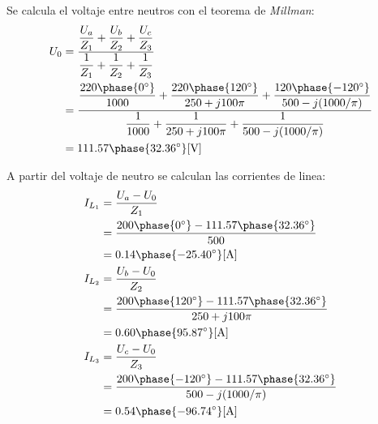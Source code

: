 \documentclass[letter,11pt]{article}
\begin{document}
\begin{enumerate}
Se calcula el voltaje entre neutros con el teorema de \emph{Millman}:
\begin{equation*}
    \begin{split}
        U_0 &= \dfrac{
                   \dfrac{U_a}{Z_1}+\dfrac{U_b}{Z_2}+\dfrac{U_c}{Z_3}
               }{
                   \dfrac{1}{Z_1}+\dfrac{1}{Z_2}+\dfrac{1}{Z_3}
               }\\
            &= \dfrac{
                   \dfrac{220\phase{0^{\circ}}}{1000}+
                   \dfrac{220\phase{120^{\circ}}}{250+j100\pi}+
                   \dfrac{120\phase{-120^{\circ}}}{500-j(1000/\pi)}
               }{
                   \dfrac{1}{1000}+
                   \dfrac{1}{250+j100\pi}+
                   \dfrac{1}{500-j(1000/\pi)}
               }\\
            &= 111.57\phase{32.36^{\circ}}[\text{V}]\\
    \end{split}
\end{equation*}

A partir del voltaje de neutro se calculan las corrientes de linea:
\begin{equation*}
    \begin{split}
        I_{L_1} &= \frac{U_a - U_0}{Z_1}\\
                &= \frac{200\phase{0^{\circ}}
                   -111.57\phase{32.36^{\circ}}}{500}\\
                &= 0.14\phase{-25.40^{\circ}}[\text{A}]\\
        I_{L_2} &= \frac{U_b - U_0}{Z_2}\\
                &= \frac{200\phase{120^{\circ}}
                   -111.57\phase{32.36^{\circ}}}{250+j100\pi}\\
                &= 0.60\phase{95.87^{\circ}}[\text{A}]\\
        I_{L_3} &= \frac{U_c - U_0}{Z_3}\\
                &= \frac{200\phase{-120^{\circ}}
                   -111.57\phase{32.36^{\circ}}}{500-j(1000/\pi)}\\
                &= 0.54\phase{-96.74^{\circ}}[\text{A}]\\
    \end{split}
\end{equation*}


\end{enumerate}
\end{document}
